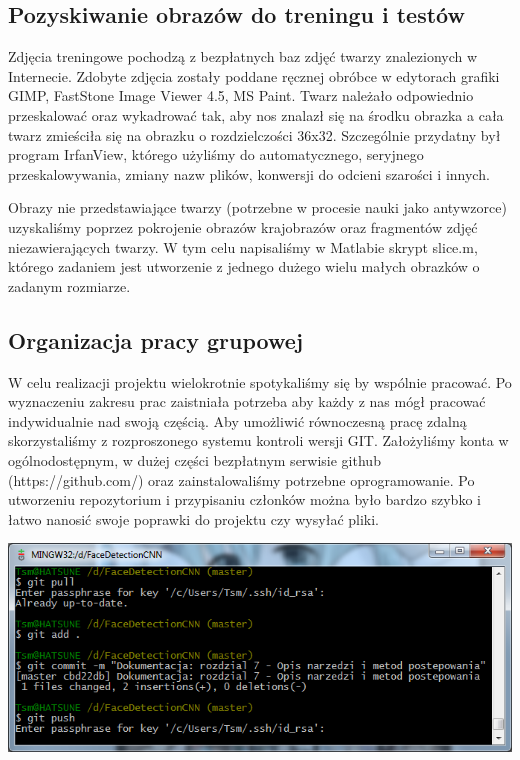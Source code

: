 \documentclass[11pt,a4paper]{article}
\begin{document}
\subsection{Pozyskiwanie obrazów do treningu i testów}
Zdjęcia treningowe pochodzą z bezpłatnych baz zdjęć twarzy znalezionych w Internecie. Zdobyte 
zdjęcia zostały poddane ręcznej obróbce w edytorach grafiki GIMP, FastStone Image Viewer 4.5, 
MS Paint. Twarz należało odpowiednio przeskalować oraz wykadrować tak, aby nos znalazł się na środku
obrazka a cała twarz zmieściła się na obrazku o rozdzielczości 36x32.  Szczególnie przydatny był 
program IrfanView, którego użyliśmy do automatycznego, seryjnego przeskalowywania, zmiany nazw 
plików, konwersji do odcieni szarości i innych.

Obrazy nie przedstawiające twarzy (potrzebne w procesie nauki jako antywzorce) uzyskaliśmy poprzez 
pokrojenie obrazów krajobrazów oraz fragmentów zdjęć niezawierających twarzy. W tym celu napisaliśmy
w Matlabie skrypt slice.m, którego zadaniem jest utworzenie z jednego dużego wielu małych obrazków 
o zadanym rozmiarze.

\subsection{Organizacja pracy grupowej}

W celu realizacji projektu wielokrotnie spotykaliśmy się by wspólnie pracować. Po wyznaczeniu 
zakresu prac zaistniała potrzeba aby każdy z nas mógł pracować indywidualnie nad swoją częścią. Aby 
umożliwić równoczesną pracę zdalną skorzystaliśmy z rozproszonego systemu kontroli wersji GIT. 
Założyliśmy konta w ogólnodostępnym, w dużej części bezpłatnym serwisie github (https://github.com/)
oraz zainstalowaliśmy potrzebne oprogramowanie. Po utworzeniu repozytorium i przypisaniu członków 
można było bardzo szybko i łatwo nanosić swoje poprawki do projektu czy wysyłać pliki.

\vspace*{0.5cm}
\begin{center}
\includegraphics[scale=0.6]{gitconsole}
\end{center}
\vspace*{0.5cm}
\end{document}

